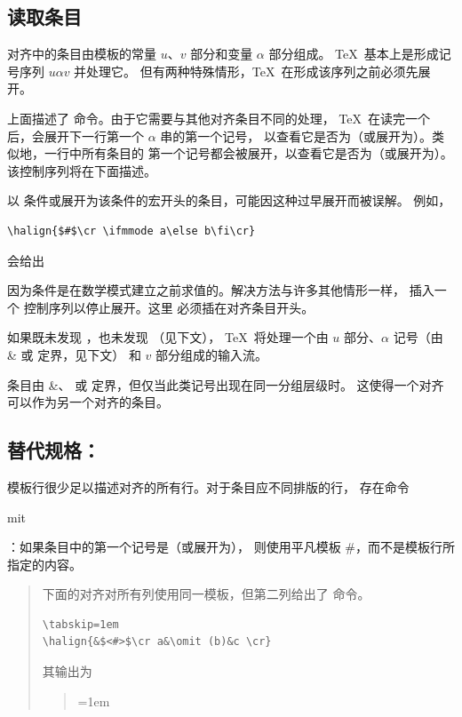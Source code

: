 \documentclass[a4paper]{rapport3}
\makeatletter
\newenvironment{disp}{\begin{quotation}}{\end{quotation}}
\newenvironment{example}{\begin{quotation}}{\end{quotation}}
\def\cstoidx#1\par{\index{#1@\cs{#1}}}
\def\csidx#1{\cstoidx #1\par\cs{#1}}
\makeatother
\begin{document}
\subsection{读取条目}

对齐中的条目由模板的常量 $u$、$v$ 部分和变量 $\alpha$ 部分组成。
\TeX\ 基本上是形成记号序列 $u\alpha v$ 并处理它。
但有两种特殊情形，\TeX\ 在形成该序列之前必须先展开。

上面描述了  命令。由于它需要与其他对齐条目不同的处理，
\TeX\ 在读完一个  后，会展开下一行第一个 $\alpha$ 串的第一个记号，
以查看它是否为（或展开为）。类似地，一行中所有条目的
第一个记号都会被展开，以查看它是否为（或展开为）。
该控制序列将在下面描述。

以  条件或展开为该条件的宏开头的条目，可能因这种过早展开而被误解。
例如，
\begin{verbatim}
\halign{$#$\cr \ifmmode a\else b\fi\cr}
\end{verbatim}
会给出
\begin{disp}\leavevmode
     \vbox{}\end{disp}
因为条件是在数学模式建立之前求值的。解决方法与许多其他情形一样，
插入一个  控制序列以停止展开。这里  必须插在对齐条目开头。

如果既未发现 ，也未发现 （见下文），
\TeX\ 将处理一个由 $u$ 部分、$\alpha$ 记号（由 \n\& 或  定界，见下文）
和 $v$ 部分组成的输入流。

条目由 \n\&、 或  定界，但仅当此类记号出现在同一分组层级时。
这使得一个对齐可以作为另一个对齐的条目。

\subsection{替代规格：}

模板行很少足以描述对齐的所有行。对于条目应不同排版的行，
存在命令 \csidx{omit}：如果条目中的第一个记号是（或展开为），
则使用平凡模板 \n\#，而不是模板行所指定的内容。

\begin{example} 下面的对齐对所有列使用同一模板，但第二列给出了  命令。
\begin{verbatim}
\tabskip=1em
\halign{&$<#>$\cr a&\omit (b)&c \cr}
\end{verbatim}
其输出为
\begin{disp}\leavevmode\vbox{\tabskip=1em
}
\end{disp}
\end{example}
\end{document}
